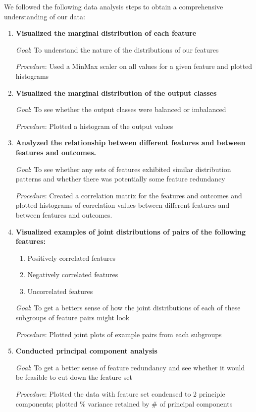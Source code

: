 \documentclass[12pt]{article}
\begin{document}
We followed the following data analysis steps to obtain a comprehensive understanding of our data:

\begin{enumerate}
\item \textbf{Visualized the marginal distribution of each feature}

\textit{Goal}: To understand the nature of the distributions of our features

\textit{Procedure}: Used a MinMax scaler on all values for a given feature and plotted histograms

\item \textbf{Visualized the marginal distribution of the output classes}

\textit{Goal}: To see whether the output classes were balanced or imbalanced

\textit{Procedure}: Plotted a histogram of the output values

\item \textbf{Analyzed the relationship between different features and between features and outcomes.}

\textit{Goal}: To see whether any sets of features exhibited similar distribution patterns and whether there was potentially some feature redundancy

\textit{Procedure}: Created a correlation matrix for the features and outcomes and plotted histograms of correlation values between different features and between features and outcomes.

\item \textbf{Visualized examples of joint distributions of pairs of the following features:}
\begin{enumerate}
\item Positively correlated features
\item Negatively correlated features
\item Uncorrelated features
\end{enumerate}

\textit{Goal}: To get a betters sense of how the joint distributions of each of these subgroups of feature pairs might look

\textit{Procedure}: Plotted joint plots of example pairs from each subgroups

\item \textbf{Conducted principal component analysis}

\textit{Goal}: To get a better sense of feature redundancy and see whether it would be feasible to cut down the feature set

\textit{Procedure}: Plotted the data with feature set condensed to 2 principle components; plotted \% variance retained by \# of principal components

\end{enumerate}
\end{document}
